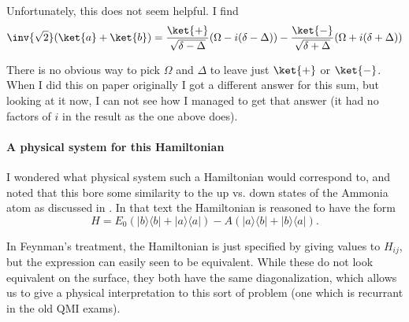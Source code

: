 {Unfortunately, this does not seem helpful.  I find
%
\begin{equation}\label{eqn:qmIexamPractice2008Dec:2:170}
\inv{\sqrt{2}} ( \ket{a} + \ket{b} ) =
\frac{\ket{+}}{\sqrt{\delta - \Delta}}( \Omega - i (\delta - \Delta) )
-\frac{\ket{-}}{\sqrt{\delta + \Delta}}( \Omega + i (\delta + \Delta) )
\end{equation}

There is no obvious way to pick \(\Omega\) and \(\Delta\) to leave just \(\ket{+}\) or \(\ket{-}\).  When I did this on paper originally I got a different answer for this sum, but looking at it now, I can not see how I managed to get that answer (it had no factors of \(i\) in the result as the one above does).

\paragraph{A physical system for this Hamiltonian}

I wondered what physical system such a Hamiltonian would correspond to, and noted that this bore some similarity to the up vs. down states of the Ammonia atom as discussed in \citep{feynman1963flp}.  In that text the Hamiltonian is reasoned to have the form
%
\begin{equation}\label{eqn:qmIexamPractice2008Dec:2:180}
H = E_0 ( {\lvert {b} \rangle}{\langle {b} \rvert}+ {\lvert {a} \rangle}{\langle {a} \rvert})- A( {\lvert {a} \rangle}{\langle {b} \rvert}+ {\lvert {b} \rangle}{\langle {a} \rvert}).
\end{equation}

In Feynman's treatment, the Hamiltonian is just specified by giving values to \(H_{ij}\), but the expression can easily seen to be equivalent.  While these do not look equivalent on the surface, they both have the same diagonalization, which allows us to give a physical interpretation to this sort of problem (one which is recurrant in the old QMI exams).
} %
